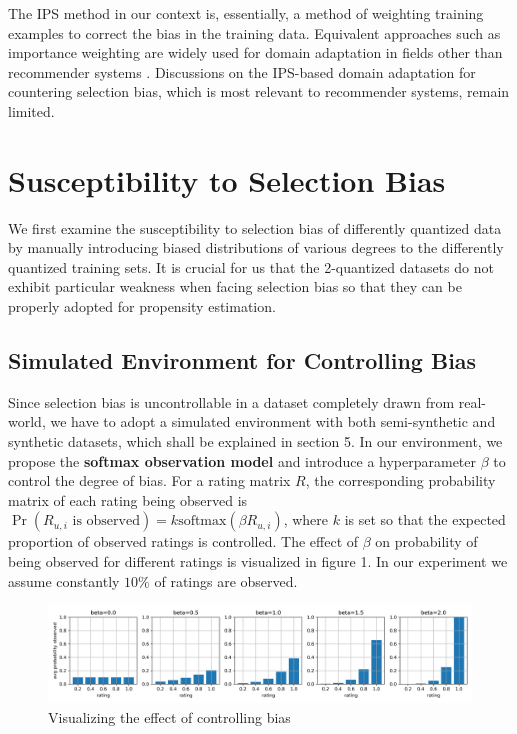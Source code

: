\documentclass{article}
\begin{document}
The IPS method in our context is, essentially, a method of weighting training examples to correct the bias in the training data. Equivalent approaches such as importance weighting are widely used for domain adaptation in fields other than recommender systems \cite{sugiyama2007covariate} \cite{zhang2018importance}. Discussions on the IPS-based domain adaptation for countering selection bias, which is most relevant to recommender systems, remain limited.

\section{Susceptibility to Selection Bias}
We first examine the susceptibility to selection bias of differently quantized data by manually introducing biased distributions of various degrees to the differently quantized training sets. It is crucial for us that the 2-quantized datasets do not exhibit particular weakness when facing selection bias so that they can be properly adopted for propensity estimation.

\subsection{Simulated Environment for Controlling Bias}
Since selection bias is uncontrollable in a dataset completely drawn from real-world, we have to adopt a simulated environment \cite{krauth2020offline} with both semi-synthetic and synthetic datasets, which shall be explained in section 5. In our environment, we propose the \textbf{softmax observation model} and introduce a hyperparameter $\beta$ to control the degree of bias. For a rating matrix $R$, the corresponding probability matrix of each rating being observed is $\Pr(R_{u,i}\text{ is observed}) = k\text{softmax}(\beta R_{u,i})$, where $k$ is set so that the expected proportion of observed ratings is controlled. The effect of $\beta$ on probability of being observed for different ratings is visualized in figure 1. In our experiment we assume constantly $10\%$ of ratings are observed.
\begin{figure}
  \centering
  \includegraphics[width=\textwidth]{visualize.png}
  \caption{Visualizing the effect of controlling bias}
\end{figure}
\end{document}
